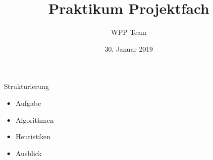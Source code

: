 \documentclass{beamer}           %
\title[WPP]{Praktikum Projektfach}
\author[Team]{WPP Team}
\institute{Hochschule Niederrhein - Fachbereich Elektrotechnik \& Informatik}
\date{30. Januar 2019}
\begin{document}
\frame[plain]{\titlepage}



\begin{frame}{Strukturierung}
	\begin{itemize}
		\item Aufgabe
		\item Algorithmen
		\item Heuristiken
		\item Ausblick
	\end{itemize}
\end{frame}



\begin{frame}{}
\fontsize{24pt}{12pt}\selectfont
{}
\end{frame}
\end{document}
